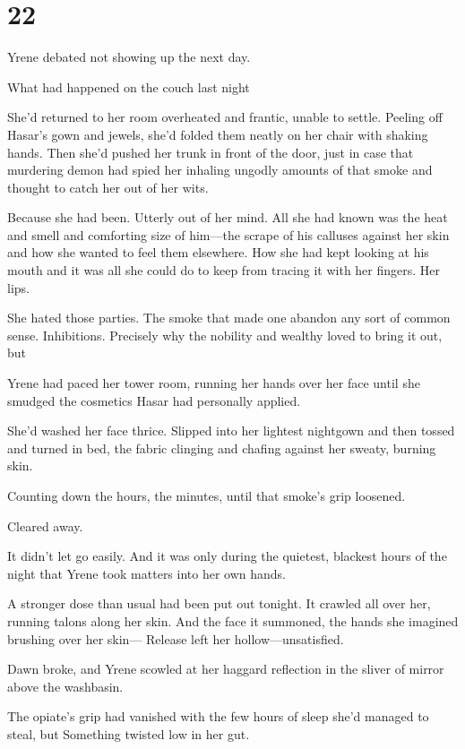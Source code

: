 
\chapter{22}

Yrene debated not showing up the next day.

What had happened on the couch last night 

She'd returned to her room overheated and frantic, unable to settle. Peeling off Hasar's gown and jewels, she'd folded them neatly on her chair with shaking hands. Then she'd pushed her trunk in front of the door, just in case that murdering demon had spied her inhaling ungodly amounts of that smoke and thought to catch her out of her wits.

Because she had been. Utterly out of her mind. All she had known was the heat and smell and comforting size of him---the scrape of his calluses against her skin and how she wanted to feel them elsewhere. How she had kept looking at his mouth and it was all she could do to keep from tracing it with her fingers. Her lips.

She hated those parties. The smoke that made one abandon any sort of common sense. Inhibitions. Precisely why the nobility and wealthy loved to bring it out, but 

Yrene had paced her tower room, running her hands over her face until she smudged the cosmetics Hasar had personally applied.

She'd washed her face thrice. Slipped into her lightest nightgown and then tossed and turned in bed, the fabric clinging and chafing against her sweaty, burning skin.

Counting down the hours, the minutes, until that smoke's grip loosened.

Cleared away.

It didn't let go easily. And it was only during the quietest, blackest hours of the night that Yrene took matters into her own hands.

A stronger dose than usual had been put out tonight. It crawled all over her, running talons along her skin. And the face it summoned, the hands she imagined brushing over her skin--- Release left her hollow---unsatisfied.

Dawn broke, and Yrene scowled at her haggard reflection in the sliver of mirror above the washbasin.

The opiate's grip had vanished with the few hours of sleep she'd managed to steal, but  Something twisted low in her gut.

